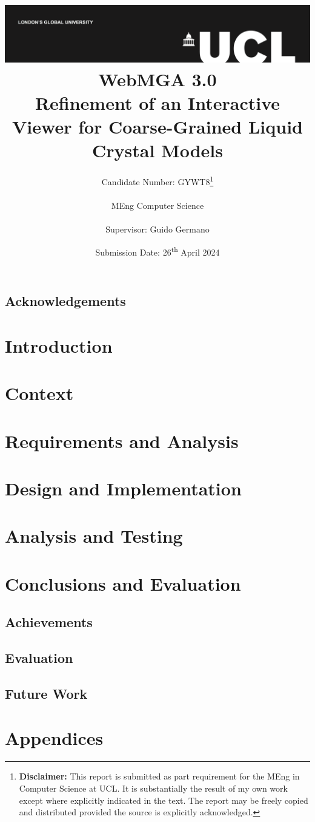 \documentclass[a4paper,12pt]{report}
\title{
{\vspace{-14em} \includegraphics[width=\textwidth]{assets/images/ucl}}\\
{{\Huge WebMGA 3.0}}\\
{\large Refinement of an Interactive Viewer for Coarse-Grained Liquid Crystal Models}\\
}
\date{Submission Date: 26\textsuperscript{th} April 2024}
\author{Candidate Number: GYWT8\thanks{
{\bf Disclaimer:}
This report is submitted as part requirement for the MEng in Computer Science at UCL. It is
substantially the result of my own work except where explicitly indicated in the text. The report may be freely copied and distributed provided the source is explicitly acknowledged.}
\\ \\
MEng Computer Science\\ \\
Supervisor: Guido Germano}
\begin{document}
 
\onehalfspacing
\maketitle

\begin{abstract}

\end{abstract}

\tableofcontents

\setcounter{page}{1}
\section{Acknowledgements}

\chapter{Introduction}


\chapter{Context}


\chapter{Requirements and Analysis}


\chapter{Design and Implementation}








\chapter{Analysis and Testing}


\chapter{Conclusions and Evaluation}
\section{Achievements}


\section{Evaluation}

\section{Future Work}

\appendix

\printbibliography

\chapter{Appendices}

\end{document}
